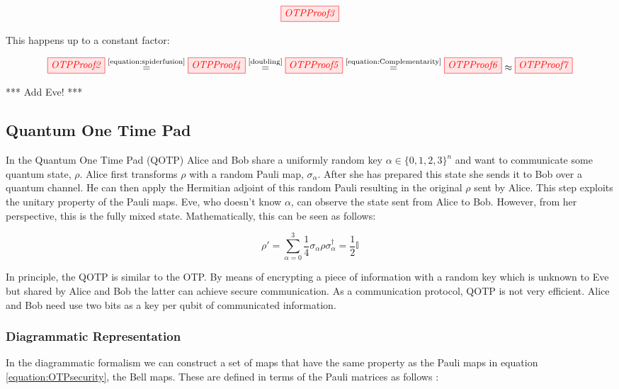 \documentclass[]{article}
\newcommand{\equaltext}[1]{\ensuremath{\stackrel{\text{#1}}{=}}}
\begin{document}
\begin{equation}
\label{equation:OTPProof3}
\tikzfig{OTPProof3}
\end{equation}

This happens up to a constant factor:

\begin{equation}
\label{equation:OTPProoflong}
\tikzfig{OTPProof2}\equaltext{\ref{equation:spiderfusion}} \tikzfig{OTPProof4} \equaltext{\ref{doubling}} \tikzfig{OTPProof5} \equaltext{\ref{equation:Complementarity}} \tikzfig{OTPProof6} \approx \tikzfig{OTPProof7}
\end{equation}

*** Add Eve! ***

\subsection{Quantum One Time Pad}
\label{QOTP}
In the Quantum One Time Pad (QOTP) Alice and Bob share a uniformly random key $ \alpha \in \{0,1,2,3\}^n$ and want to communicate some quantum state, $\rho$. Alice first transforms $\rho$ with a random Pauli map, $\sigma_\alpha$. After she has prepared this state she sends it to Bob over a quantum channel. He can then apply the Hermitian adjoint of this random Pauli resulting in the original $\rho$ sent by Alice. This step exploits the unitary property of the Pauli maps. Eve, who doesn't know $\alpha$, can observe the state sent from Alice to Bob. However, from her perspective, this is the fully mixed state. Mathematically, this can be seen as follows:

\begin{equation}
	\label{equation:OTPsecurity}
	\rho' = \sum\limits_{\alpha = 0}^3 \frac{1}{4} \sigma_\alpha \rho \sigma_\alpha^\dagger = \frac{1}{2}\mathbb{I}
\end{equation}

In principle, the QOTP is similar to the OTP. By means of encrypting a piece of information with a random key which is unknown to Eve but shared by Alice and Bob the latter can achieve secure communication. As a communication protocol, QOTP is not very efficient. Alice and Bob need use two bits as a key per qubit of communicated information.

\subsubsection{Diagrammatic Representation}
\label{DiagramRepresentationQOTP}
In the diagrammatic formalism we can construct a set of maps that have the same property as the Pauli maps in equation \ref{equation:OTPsecurity}, the Bell maps. These are defined in terms of the Pauli matrices as follows \cite{Coecke2017}:
\end{document}
